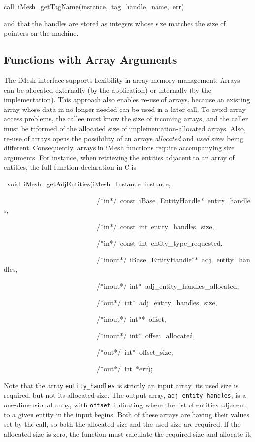 \begin{lyxcode}
call~iMesh\_getTagName(instance,~tag\_handle,~name,~err)
\end{lyxcode}
and that the handles are stored as integers whose size matches the
size of pointers on the machine.


\subsection{Functions with Array Arguments}

The iMesh interface supports flexibility in array memory management.
Arrays can be allocated externally (by the application) or internally
(by the implementation). This approach also enables re-use of arrays,
because an existing array whose data in no longer needed can be used in
a later call. To avoid array access problems, the callee must know the
size of incoming arrays, and the caller must be informed of the
allocated size of implementation-allocated arrays. Also, re-use of
arrays opens the possibility of an arrays \emph{allocated} and
\emph{used} sizes being different. Consequently, arrays in iMesh
functions require accompanying size arguments. For instance, when
retrieving the entities adjacent to an array of entities, the full
function declaration in C is

\begin{lyxcode}
~void~iMesh\_getAdjEntities(iMesh\_Instance~instance,

~~~~~~~~~~~~~~~~~~~~~~~~~~~/{*}in{*}/~const~iBase\_EntityHandle{*}~entity\_handles,

~~~~~~~~~~~~~~~~~~~~~~~~~~~/{*}in{*}/~const~int~entity\_handles\_size,

~~~~~~~~~~~~~~~~~~~~~~~~~~~/{*}in{*}/~const~int~entity\_type\_requested,~

~~~~~~~~~~~~~~~~~~~~~~~~~~~/{*}inout{*}/~iBase\_EntityHandle{*}{*}~adj\_entity\_handles,

~~~~~~~~~~~~~~~~~~~~~~~~~~~/{*}inout{*}/~int{*}~adj\_entity\_handles\_allocated,

~~~~~~~~~~~~~~~~~~~~~~~~~~~/{*}out{*}/~int{*}~adj\_entity\_handles\_size,

~~~~~~~~~~~~~~~~~~~~~~~~~~~/{*}inout{*}/~int{*}{*}~offset,

~~~~~~~~~~~~~~~~~~~~~~~~~~~/{*}inout{*}/~int{*}~offset\_allocated,

~~~~~~~~~~~~~~~~~~~~~~~~~~~/{*}out{*}/~int{*}~offset\_size,

~~~~~~~~~~~~~~~~~~~~~~~~~~~/{*}out{*}/~int~{*}err);
\end{lyxcode}
Note that the array \texttt{entity\_handles} is strictly an input array;
its used size is required, but not its allocated size. The output array,
\texttt{adj\_entity\_handles}, is a one-dimensional array, with
\texttt{offset} indicating where the list of entities adjacent to a
given entity in the input begins. Both of these arrays are having their
values set by the call, so both the allocated size and the used size are
required. If the allocated size is zero, the function must calculate the
required size and allocate it.

